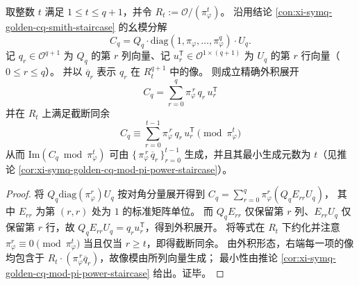 \begin{conclusion}\label{con:xi-symq-golden-cq-mod-pi-power-outer-truncation}
取整数 \(t\) 满足 \(1\le t\le q+1\)，并令 \(R_t:=\mathcal O/(\pi_\varphi^t)\)。
沿用结论 \ref{con:xi-symq-golden-cq-smith-staircase} 的幺模分解
\[
C_q=Q_q\cdot \mathrm{diag}(1,\pi_\varphi,\dots,\pi_\varphi^q)\cdot U_q.
\]
记 \(q_r\in\mathcal O^{q+1}\) 为 \(Q_q\) 的第 \(r\) 列向量、记 \(u_r^{\mathsf T}\in\mathcal O^{1\times(q+1)}\) 为 \(U_q\) 的第 \(r\) 行向量（\(0\le r\le q\)）。
并以 \(\overline q_r\) 表示 \(q_r\) 在 \(R_t^{q+1}\) 中的像。
则成立精确外积展开
\[
\boxed{\;
C_q=\sum_{r=0}^{q}\pi_\varphi^{\,r}\,q_r\,u_r^{\mathsf T}\;}
\]
并在 \(R_t\) 上满足截断同余
\[
\boxed{\;
C_q\equiv \sum_{r=0}^{t-1}\pi_\varphi^{\,r}\,q_r\,u_r^{\mathsf T}\pmod{\pi_\varphi^{t}}\;}
\]
从而 \(\mathrm{Im}(C_q\bmod \pi_\varphi^t)\) 可由 \(\{\,\pi_\varphi^{\,r}\,\overline q_r\,\}_{r=0}^{t-1}\) 生成，并且其最小生成元数为 \(t\)（见推论 \ref{cor:xi-symq-golden-cq-mod-pi-power-staircase}）。
\end{conclusion}
\begin{proof}
将 \(Q_q\mathrm{diag}(\pi_\varphi^r)U_q\) 按对角分量展开得到
\(
C_q=\sum_{r=0}^{q}\pi_\varphi^r(Q_qE_{rr}U_q)
\)，
其中 \(E_{rr}\) 为第 \((r,r)\) 处为 \(1\) 的标准矩阵单位。
而 \(Q_qE_{rr}\) 仅保留第 \(r\) 列、\(E_{rr}U_q\) 仅保留第 \(r\) 行，故 \(Q_qE_{rr}U_q=q_ru_r^{\mathsf T}\)，得到外积展开。
将等式在 \(R_t\) 下约化并注意 \(\pi_\varphi^r\equiv 0\pmod{\pi_\varphi^t}\) 当且仅当 \(r\ge t\)，即得截断同余。
由外积形态，右端每一项的像均包含于 \(R_t\cdot(\pi_\varphi^{\,r}\overline q_r)\)，故像模由所列向量生成；
最小性由推论 \ref{cor:xi-symq-golden-cq-mod-pi-power-staircase} 给出。证毕。
\end{proof}

